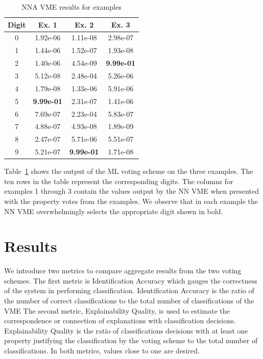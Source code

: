 \documentclass[conference]{IEEEtran}
\begin{document}
\begin{table}[htbp]
\caption{NNA VME results for examples}
\centering
\begin{tabular}{| c | c | c | c |}
\hline
 Digit & Ex. 1 & Ex. 2 & Ex. 3 \\
\hline\hline
0 & 1.92e-06 & 1.11e-08 & 2.98e-07\\ 
\hline
1 & 1.44e-06 & 1.52e-07 & 1.93e-08 \\
\hline
2 & 1.40e-06 & 4.54e-09 & \textbf{9.99e-01} \\
\hline
3 & 5.12e-08 & 2.48e-04 & 5.26e-06 \\
\hline
4 & 1.79e-08 & 1.33e-06 & 5.91e-06 \\
\hline
5 & \textbf{9.99e-01} & 2.31e-07 & 1.41e-06 \\
\hline
6 & 7.69e-07 & 2.23e-04 & 5.83e-07 \\
\hline
7 & 4.88e-07 & 4.93e-08 & 1.89e-09 \\
\hline
8 & 2.47e-07 & 5.71e-06 & 5.51e-07 \\
\hline
9 & 5.21e-07 & \textbf{9.99e-01} & 1.71e-08 \\
\hline
\end{tabular}
\label{table:nnavoter}
\end{table}

Table~\ref{table:nnavoter} shows the output of the ML voting scheme on the three examples.  The ten rows in the table represent the corresponding digits.  The columns for examples 1 through 3 contain the values output by the NN VME when presented with the property votes from the examples.  We observe that in each example the NN VME overwhelmingly selects the appropriate digit shown in bold.

\section{Results}

We introduce two metrics to compare aggregate results from the two voting schemes.  The first metric is Identification Accuracy which gauges the correctness of the system in performing classification.  Identification Accuracy is the ratio of the number of correct classifications to the total number of classifications of the VME  The second metric, Explainability Quality, is used to estimate the correspondence or connection of explanations with classification decisions.  Explainability Quality is the ratio of classifications decisions with at least one property justifying the classification by the voting scheme to the total number of classifications.   In both metrics, values close to one are desired.
\end{document}
